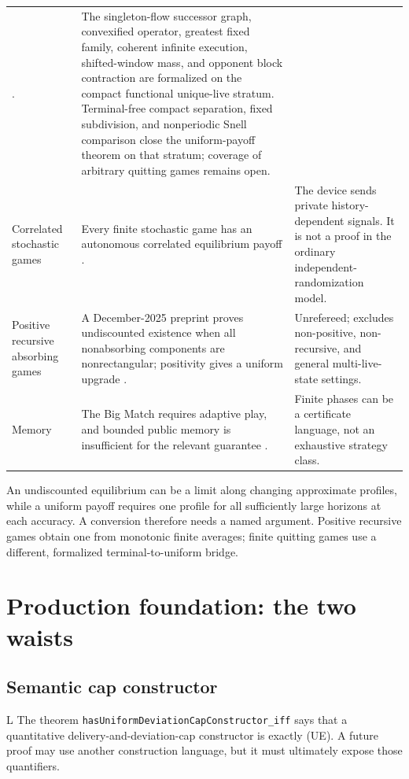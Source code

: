 \documentclass[11pt]{article}
\newcommand{\LTag}{\textsf{L}}
\newcommand{\Prod}{\LTag}
\newcommand{\Status}[1]{#1}
\begin{document}
\begin{longtable}{@{}p{}p{}p{}@{}}
\cite{AshkenaziGolanEtAl2026}. &
The singleton-flow successor graph, convexified operator, greatest fixed
family, coherent infinite execution, shifted-window mass, and opponent block
contraction are formalized on the compact functional unique-live stratum.
Terminal-free compact separation, fixed subdivision, and nonperiodic Snell
comparison close the uniform-payoff theorem on that stratum; coverage of
arbitrary quitting games remains open.\\
Correlated stochastic games &
Every finite stochastic game has an autonomous correlated equilibrium payoff
\cite{SolanVieille2002}. &
The device sends private history-dependent signals.  It is not a proof in
the ordinary independent-randomization model.\\
Positive recursive absorbing games &
A December-2025 preprint proves undiscounted existence when all nonabsorbing
components are nonrectangular; positivity gives a uniform upgrade
\cite{SolanVieille2025}. &
Unrefereed; excludes non-positive, non-recursive, and general multi-live-state
settings.\\
Memory &
The Big Match requires adaptive play, and bounded public memory is
insufficient for the relevant guarantee \cite{BlackwellFerguson1968,HansenIbsenJensenNeyman2025}. &
Finite phases can be a certificate language, not an exhaustive strategy class.\\
\bottomrule
\end{longtable}

An undiscounted equilibrium can be a limit along changing approximate
profiles, while a uniform payoff requires one profile for all sufficiently
large horizons at each accuracy.  A conversion therefore needs a named
argument.  Positive recursive games obtain one from monotonic finite
averages; finite quitting games use a different, formalized
terminal-to-uniform bridge.

\section{Production foundation: the two waists}

\subsection{Semantic cap constructor}

\Status{\Prod} The theorem
\texttt{hasUniformDeviationCapConstructor\_iff} says that a quantitative
delivery-and-deviation-cap constructor is exactly (UE).  A future proof may
use another construction language, but it must ultimately expose those
quantifiers.
\end{document}
